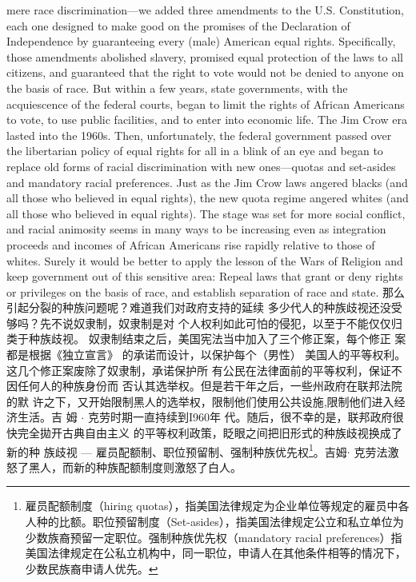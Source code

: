 \begin{paracol}{2}
mere race discrimination---we added three amendments to the
U.S. Constitution, each one designed to make good on the
promises of the Declaration of Independence by guaranteeing
every (male) American equal rights. Specifically, those amendments abolished slavery, promised equal protection of the laws
to all citizens, and guaranteed that the right to vote would not
be denied to anyone on the basis of race. But within a few years,
state governments, with the acquiescence of the federal courts,
began to limit the rights of African Americans to vote, to use
public facilities, and to enter into economic life. The Jim Crow
era lasted into the 1960s. Then, unfortunately, the federal government passed over the libertarian policy of equal rights for all
in a blink of an eye and began to replace old forms of racial discrimination with new ones---quotas and set-asides and mandatory racial preferences. Just as the Jim Crow laws angered
blacks (and all those who believed in equal rights), the new
quota regime angered whites (and all those who believed in
equal rights). The stage was set for more social conflict, and
racial animosity seems in many ways to be increasing even as integration proceeds and incomes of African Americans rise
rapidly relative to those of whites. Surely it would be better to
apply the lesson of the Wars of Religion and keep government
out of this sensitive area: Repeal laws that grant or deny rights
or privileges on the basis of race, and establish separation of race
and state.
\switchcolumn
那么引起分裂的种族问题呢？难道我们对政府支持的延续
多少代人的种族歧视还没受够吗？先不说奴隶制，奴隶制是对
个人权利如此可怕的侵犯，以至于不能仅仅归类于种族歧视。
奴隶制结束之后，美国宪法当中加入了三个修正案，每个修正
案都是根据《独立宣言》 的承诺而设计，以保护每个（男性）
美国人的平等权利。这几个修正案废除了奴隶制，承诺保护所
有公民在法律面前的平等权利，保证不因任何人的种族身份而
否认其选举权。但是若干年之后，一些州政府在联邦法院的默
许之下，又开始限制黑人的选举权，限制他们使用公共设施,限制他们进入经济生活。吉 姆 $\cdot$ 克劳时期一直持续到I960年
代。随后，很不幸的是，联邦政府很快完全拋开古典自由主义
的平等权利政策，眨眼之间把旧形式的种族歧视换成了新的种
族歧视 --- 雇员配额制、职位预留制、强制种族优先权\footnote{雇员配额制度（hiring quotas），指美国法律规定为企业单位等规定的雇员中各人种的比额。职位预留制度（Set-asides），指美国法律规定公立和私立单位为少数族裔预留一定职位。强制种族优先权（mandatory  racial preferences）指美国法律规定在公私立机构中，同一职位，申请人在其他条件相等的情况下，少数民族裔申请人优先。}。吉姆$\cdot$ 克劳法激怒了黑人，而新的种族配额制度则激怒了白人。

\end{paracol}
